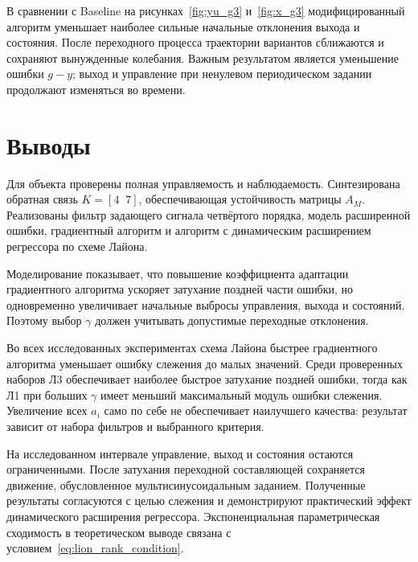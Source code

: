 В сравнении с Baseline на рисунках~\ref{fig:yu_g3} и~\ref{fig:x_g3}
модифицированный алгоритм уменьшает наиболее сильные начальные
отклонения выхода и состояния. После переходного процесса
траектории вариантов сближаются и сохраняют вынужденные колебания.
Важным результатом является уменьшение ошибки $g-y$;
выход и управление при ненулевом периодическом задании
продолжают изменяться во времени.

\section{Выводы}

Для объекта проверены полная управляемость и наблюдаемость.
Синтезирована обратная связь $K=[4\;\;7]$, обеспечивающая устойчивость
матрицы $A_M$.
Реализованы фильтр задающего сигнала четвёртого порядка,
модель расширенной ошибки, градиентный алгоритм и алгоритм
с динамическим расширением регрессора по схеме Лайона.

Моделирование показывает, что повышение коэффициента адаптации
градиентного алгоритма ускоряет затухание поздней части ошибки,
но одновременно увеличивает начальные выбросы управления, выхода
и состояний. Поэтому выбор $\gamma$ должен учитывать допустимые
переходные отклонения.

Во всех исследованных экспериментах схема Лайона быстрее
градиентного алгоритма уменьшает ошибку слежения до малых значений.
Среди проверенных наборов Л3 обеспечивает наиболее быстрое затухание
поздней ошибки, тогда как Л1 при больших $\gamma$ имеет меньший
максимальный модуль ошибки слежения. Увеличение всех $a_i$
само по себе не обеспечивает наилучшего качества:
результат зависит от набора фильтров и выбранного критерия.


На исследованном интервале управление, выход и состояния остаются
ограниченными. После затухания переходной составляющей сохраняется
движение, обусловленное мультисинусоидальным заданием.
Полученные результаты согласуются с целью слежения и демонстрируют
практический эффект динамического расширения регрессора.
Экспоненциальная параметрическая сходимость в теоретическом выводе
связана с условием~\eqref{eq:lion_rank_condition}.